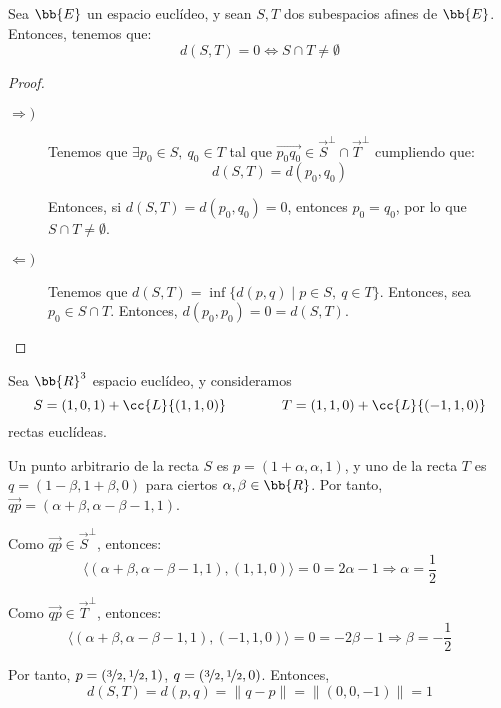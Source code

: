 \begin{coro}
    Sea $\bb{E}$ un espacio euclídeo, y sean $S,T$ dos subespacios afines de $\bb{E}$. Entonces, tenemos que:
    \begin{equation*}
        d(S,T)=0 \Longleftrightarrow S\cap T \neq \emptyset
    \end{equation*}
\end{coro}
\begin{proof}\
\begin{description}
    \item[$\Longrightarrow)$] Tenemos que $\exists p_0\in S,~ q_0\in T$ tal que $\vec{p_0q_0}\in \vec{S}^\perp\cap \vec{T}^\perp$ cumpliendo que:
    \begin{equation*}
        d(S,T)=d(p_0,q_0)
    \end{equation*}

    Entonces, si $d(S,T)=d(p_0,q_0)=0$, entonces $p_0=q_0$, por lo que $S\cap T\neq \emptyset$.

    \item[$\Longleftarrow)$] Tenemos que $d(S,T)=\inf\{d(p,q)\mid p\in S,~q\in T\}$. Entonces, sea $p_0\in S\cap T$. Entonces, $d(p_0,p_0)=0=d(S,T)$.
\end{description}
\end{proof}

\begin{ejemplo}
    Sea $\bb{R}^3$ espacio euclídeo, y consideramos $$S= (1,0,1)+\cc{L}\{(1,1, 0)\}\qquad \qquad T= (1,1,0)+\cc{L}\{(-1,1,0)\}$$ rectas euclídeas.

    Un punto arbitrario de la recta $S$ es $p=(1+\alpha, \alpha, 1)$, y uno de la recta $T$ es $q=(1-\beta, 1+\beta, 0)$ para ciertos $\alpha,\beta\in \bb{R}$. Por tanto, $\vec{qp}=(\alpha + \beta, \alpha-\beta-1, 1)$.

    Como $\vec{qp}\in \vec{S}^\perp$, entonces:
    \begin{equation*}
        \langle (\alpha+\beta, \alpha-\beta-1, 1), (1,1,0)\rangle = 0 = 2\alpha-1 \Longrightarrow \alpha = \frac{1}{2}
    \end{equation*}
    
    Como $\vec{qp}\in \vec{T}^\perp$, entonces:
    \begin{equation*}
        \langle (\alpha+\beta, \alpha-\beta-1, 1), (-1,1,0)\rangle = 0 = -2\beta-1 \Longrightarrow \beta = -\frac{1}{2}
    \end{equation*}

    Por tanto, $p=(\nicefrac{3}{2},\nicefrac{1}{2}, 1)$, $q=(\nicefrac{3}{2}, \nicefrac{1}{2}, 0)$. Entonces,
    \begin{equation*}
        d(S,T)=d(p,q) = \|q-p\| = \|(0,0,-1)\| = 1
    \end{equation*}
\end{ejemplo}



